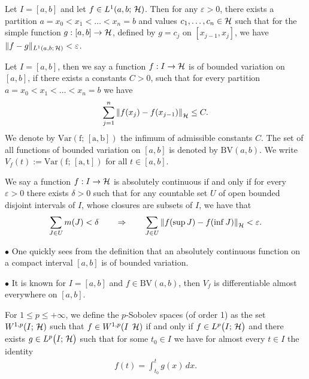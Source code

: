 \begin{lemma}\label{lemma:approx by step func}
	Let $ I=[a,b] $ and let $ f\in L^1(a,b;\,\mathcal{H})$.
	Then for any $ \varepsilon>0 $, there exists
	a partition $ a=x_0<x_1<\ldots<x_n=b $ and
	values $ c_1,\ldots,c_n\in \mathcal{H} $ such that
	for the simple function $ g:[a,b]\rightarrow\mathcal{H} $,
	defined by $ g=c_j $ on $ [x_{j-1},x_j] $,
	we have $ \Vert f-g\Vert_{L^1(a,b;\,\mathcal{H})}<\varepsilon $.
\end{lemma}

\begin{definition}
	Let $ I=[a,b] $, then
	we say a function $ f:I\rightarrow\mathcal{H} $ is of bounded 
	variation on $ [a,b] $, if there exists
	a constants $ C>0 $, such that for
	every partition $ a=x_0<x_1<\ldots<x_n=b $
	we have
	\begin{align*}
		\sum_{j=1}^n \left\Vert f(x_j)-f(x_{j-1})\right\Vert_{\mathcal{H}}
		\leq C.
	\end{align*}
	We denote by $ \mathrm{Var(f;\,[a,b])} $
	the infimum of admissible constants $ C $.
	The set of all functions of bounded 
	variation on $ [a,b] $ is denoted by 
	$ \mathrm{BV}(a,b) $. We write
	$ V_f(t):=\mathrm{Var(f;\,[a,t])} $
	for all $ t\in[a,b] $.
\end{definition}

\begin{definition}
	We say a function $ f:I\rightarrow\mathcal{H} $ is
	absolutely continuous if and only if
	for every $ \varepsilon>0 $ there exists
	$ \delta>0 $ such that for any
	countable set $ U $ of open bounded disjoint intervals
	of $ I $, whose closures are subsets of $ I $, we have that
	\begin{align*}
		\sum_{J\in U} m(J)
		<\delta
		\qquad\Rightarrow\qquad
		\sum_{J\in U}\left\Vert f(\sup J) -f(\inf J)\right\Vert_{\mathcal{H}}
		<\varepsilon.
	\end{align*}
\end{definition}

\begin{remark}
	$\bullet$ One quickly sees from the definition 
	that an absolutely continuous function on a
	compact interval $ [a,b] $ is of
	bounded variation.\smallskip
	
	$\bullet$ It is known for $ I=[a,b] $ 
	and $ f\in\mathrm{BV}(a,b) $,
	then $ V_f $ is differentiable almost everywhere on
	$ [a,b] $. 
\end{remark}

\begin{definition}\label{definition:sobolev space for hilbert space}
	For $ 1\leq p\leq \plus\infty $, we define the $ p $-Sobolev spaces
	(of order 1) as the set $ W^{1,p}(I;\,\mathcal{H}) $ such that
	$ f\in W^{1,p}(I\;\,\mathcal{H})$ if and only if $ f\in L^{p}\big(I;\,\mathcal{H}\big) $
	and there exists $ g\in L^{p}\big(I;\,\mathcal{H}\big) $ such that for
	some $ t_0\in I $ we have for almost
	every $ t\in I $ the identity
	\begin{align*}
		f(t)=\int_{t_0}^t g(x)\,dx.
	\end{align*}
\end{definition}

